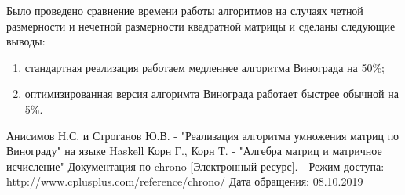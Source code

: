 \documentclass[a4paper,12pt]{article}
\begin{document}
Было проведено сравнение времени работы алгоритмов на случаях четной
размерности и нечетной размерности квадратной матрицы и сделаны
следующие выводы:

\begin{enumerate}
    \item стандартная реализация работаем медленнее алгоритма Винограда
        на 50\%;
    \item оптимизированная версия алгоримта Винограда работает быстрее
        обычной на 5\%.
\end{enumerate}

\newpage
{}

\begin{thebibliography}{}
     Анисимов Н.С. и Строганов Ю.В. - "Реализация алгоритма умножения матриц по Винограду"
на языке Haskell
     Корн Г., Корн Т. - "Алгебра матриц и матричное исчисление"
     Документация по chrono [Электронный ресурс]. -  Режим доступа: http://www.cplusplus.com/reference/chrono/ Дата обращения: 08.10.2019
\end{thebibliography}
\end{document}
